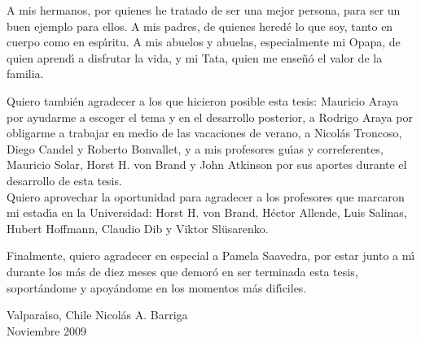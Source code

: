 
\def\baselinestretch{1.0}

\noindent
A mis hermanos, por quienes he tratado de ser una mejor persona, para ser un
buen ejemplo para ellos. A mis padres, de quienes hered\'e lo que soy, tanto en cuerpo como en
esp\'\i ritu. A mis abuelos y abuelas, especialmente mi Opapa, de quien
aprend\'{\i} a disfrutar la
vida, y mi Tata, quien me ense\~n\'o el valor de la familia.\\
\bigskip\medskip

\noindent
Quiero tambi\'en agradecer a los que hicieron posible esta tesis: Mauricio Araya
por ayudarme a escoger el tema y en el desarrollo posterior, a Rodrigo Araya por
obligarme a trabajar en medio de las vacaciones de verano, a
Nicol\'as Troncoso, Diego Candel
y Roberto Bonvallet, y a mis profesores
gu\'\i as y correferentes, Mauricio Solar, Horst H. von Brand y John Atkinson por sus 
aportes durante el desarrollo de esta tesis.\\

\noindent
Quiero aprovechar la oportunidad para agradecer a los profesores que marcaron mi 
estad\'\i a en la Universidad: Horst H. von Brand, H\'ector Allende, Luis Salinas, Hubert
Hoffmann, Claudio Dib y Viktor Sl\"usarenko.\\
\medskip

\noindent
Finalmente, quiero agradecer en especial a Pamela Saavedra, por estar junto a
m\'{\i}
durante los m\'as de diez meses que demor\'o en ser terminada esta tesis, soport\'andome y
apoy\'andome en los momentos m\'as dif\'\i ciles.
\bigskip\medskip

\noindent
Valpara\'{\i}so, Chile \hfill Nicol\'as A. Barriga\\
Noviembre 2009

